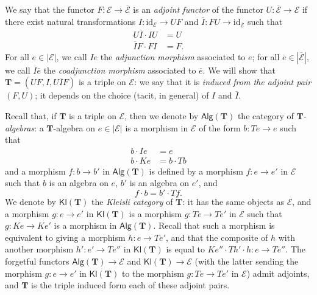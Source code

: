 \documentclass[fleqn]{article}
\newcommand{\oldpage}[1]{\marginpar{\footnotesize$\Big\vert$ \textit{p.~#1}}}
\newcommand{\id}{\mathrm{id}}
\newcommand{\TT}{\mathbf{T}}
\newcommand{\cat}[1]{\mathcal{#1}}
\newcommand{\Cat}[1]{\mathsf{#1}}
\newcommand{\set}[1]{|#1|}
\newcommand{\Alg}[1]{\Cat{Alg}(#1)}
\newcommand{\Kl}[1]{\Cat{Kl}(#1)}
\begin{document}
We say that the functor $F\colon\cat{E}\to\overline{\cat{E}}$ is an \emph{adjoint functor} of the functor $U\colon\overline{\cat{E}}\to\cat{E}$ if there exist natural transformations $I\colon\id_\cat{E}\to UF$ and $\overline{I}\colon FU\to\id_{\overline{\cat{E}}}$ such that
\[
  \begin{aligned}
    U\overline{I}\cdot IU
  & = U
  \\\overline{I}F\cdot FI
  & = F.
  \end{aligned}
  \tag{3}
\]
For all $e\in\set{\cat{E}}$, we call $Ie$ the \emph{adjunction morphism} associated to $e$; for all $\overline{e}\in\set{\overline{\cat{E}}}$, we call $\overline{I}\overline{e}$ the \emph{coadjunction morphism} associated to $\overline{e}$.
We will show that $\TT=(UF,I,U\overline{I}F)$ is a triple on $\cat{E}$: we say that it is \emph{induced from the adjoint pair $(F,U)$};
it depends on the choice (tacit, in general) of $I$ and $\overline{I}$.

Recall that, if $\TT$ is a triple on $\cat{E}$, then we denote by $\Alg{\TT}$ the category of \emph{$\TT$-algebras}: a $\TT$-algebra on $e\in{\set{\cat{E}}}$ is a morphism in $\cat{E}$ of the form $b\colon Te\to e$ such that
\[
  \begin{aligned}
    b\cdot Ie
    &= e
  \\b\cdot Ke
    &= b\cdot Tb
  \end{aligned}
  \tag{4}
\]
and a morphism $f\colon b\to b'$ in $\Alg{\TT}$ is defined by a morphism $f\colon e\to e'$ in $\cat{E}$ such that $b$ is an algebra on $e$, $b'$ is an algebra on $e'$, and
\[
  f\cdot b
  = b'\cdot Tf.
  \tag{5}
\]
We denote by $\Kl{\TT}$ the \emph{Kleisli category} of $\TT$: it has the same objects as $\cat{E}$, and a morphism $g\colon e\to e'$ in $\Kl{\TT}$ is a morphism $g\colon Te\to Te'$ in $\cat{E}$ such that $g\colon Ke\to Ke'$ is a morphism in $\Alg{\TT}$.
\oldpage{224}
Recall that such a morphism is equivalent to giving a morphism $h\colon e\to Te'$, and that the composite of $h$ with another morphism $h'\colon e'\to Te''$ in $\Kl{\TT}$ is equal to $Ke''\cdot Th'\cdot h\colon e\to Te''$.
The forgetful functors $\Alg{\TT}\to\cat{E}$ and $\Kl{\TT}\to\cat{E}$ (with the latter sending the morphism $g\colon e\to e'$ in $\Kl{\TT}$ to the morphism $g\colon Te\to Te'$ in $\cat{E}$) admit adjoints, and $\TT$ is the triple induced form each of these adjoint pairs.
\end{document}
